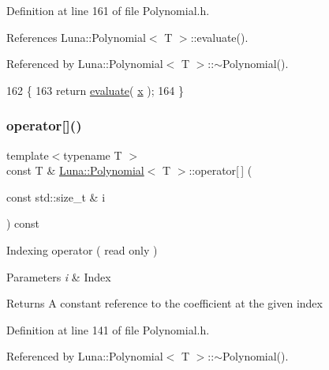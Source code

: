 Definition at line 161 of file Polynomial.\+h.



References Luna\+::\+Polynomial$<$ T $>$\+::evaluate().



Referenced by Luna\+::\+Polynomial$<$ T $>$\+::$\sim$\+Polynomial().


\begin{DoxyCode}
162     \{
163         \textcolor{keywordflow}{return} \hyperlink{classLuna_1_1Polynomial_aee740c1957530475bb4a9956f06864e4}{evaluate}( \hyperlink{namespaceHeat__plot_aa88370c16b85b784ccbde3ed88bc1991}{x} );
164     \}
\end{DoxyCode}
\mbox{\label{classLuna_1_1Polynomial_a52e4b5f045715662769eab969fdfa979}} 
\subsubsection{\texorpdfstring{operator[]()}{operator[]()}\hspace{0.1cm}{\footnotesize\ttfamily [1/2]}}
{\footnotesize\ttfamily template$<$typename T $>$ \\
const T \& \hyperlink{classLuna_1_1Polynomial}{Luna\+::\+Polynomial}$<$ T $>$\+::operator\mbox{[}$\,$\mbox{]} (\begin{DoxyParamCaption}\item[{const std\+::size\+\_\+t \&}]{i }\end{DoxyParamCaption}) const\hspace{0.3cm}{\ttfamily [inline]}}



Indexing operator ( read only ) 


\begin{DoxyParams}{Parameters}
{\em i} & Index \\
\hline
\end{DoxyParams}
\begin{DoxyReturn}{Returns}
A constant reference to the coefficient at the given index 
\end{DoxyReturn}


Definition at line 141 of file Polynomial.\+h.



Referenced by Luna\+::\+Polynomial$<$ T $>$\+::$\sim$\+Polynomial().


